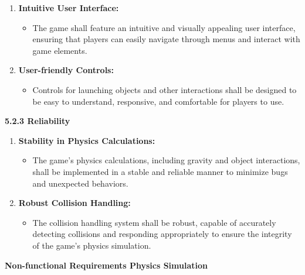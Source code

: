 \documentclass[
]{article}
\begin{document}
\begin{enumerate}
\def\labelenumi{\arabic{enumi}.}
\item
  \textbf{Intuitive User Interface:}

  \begin{itemize}
  \item
    The game shall feature an intuitive and visually appealing user
    interface, ensuring that players can easily navigate through menus
    and interact with game elements.
  \end{itemize}
\item
  \textbf{User-friendly Controls:}

  \begin{itemize}
  \item
    Controls for launching objects and other interactions shall be
    designed to be easy to understand, responsive, and comfortable for
    players to use.
  \end{itemize}
\end{enumerate}

\textbf{5.2.3 Reliability}

\begin{enumerate}
\def\labelenumi{\arabic{enumi}.}
\item
  \textbf{Stability in Physics Calculations:}

  \begin{itemize}
  \item
    The game's physics calculations, including gravity and object
    interactions, shall be implemented in a stable and reliable manner
    to minimize bugs and unexpected behaviors.
  \end{itemize}
\item
  \textbf{Robust Collision Handling:}

  \begin{itemize}
  \item
    The collision handling system shall be robust, capable of accurately
    detecting collisions and responding appropriately to ensure the
    integrity of the game's physics simulation.
  \end{itemize}
\end{enumerate}

\textbf{Non-functional Requirements Physics Simulation}
\end{document}

